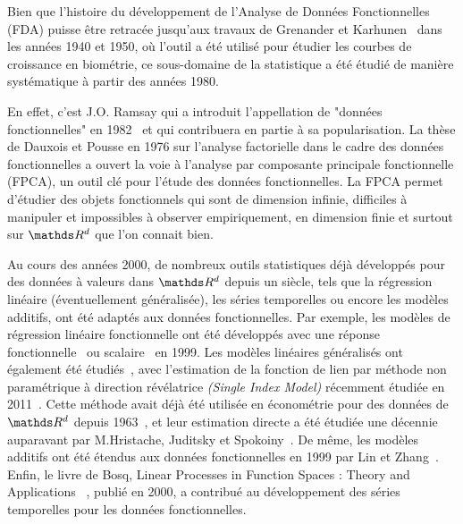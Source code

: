 

Bien que l'histoire du développement de l'Analyse de Données Fonctionnelles (FDA) puisse être retracée jusqu'aux travaux de Grenander et Karhunen~\cite{karhunen1946spektraltheorie} dans les années 1940 et 1950, où l'outil a été utilisé pour étudier les courbes de croissance en biométrie, ce sous-domaine de la statistique a été étudié de manière systématique à partir des années 1980.

\bigskip

En effet, c'est J.O. Ramsay qui a introduit l'appellation de "données fonctionnelles" en 1982~\cite{ramsay1982data} et qui contribuera en partie à sa popularisation. La thèse de Dauxois et Pousse en 1976 sur l'analyse factorielle dans le cadre des données fonctionnelles\cite{dauxois1976analyses} a ouvert la voie à l'analyse par composante principale fonctionnelle (FPCA), un outil clé pour l'étude des données fonctionnelles. La FPCA permet d'étudier des objets fonctionnels qui sont de dimension infinie, difficiles à manipuler et impossibles à observer empiriquement, en dimension finie et surtout sur $\R d$ que l'on connait bien.

\bigskip

Au cours des années 2000, de nombreux outils statistiques déjà développés pour des données à valeurs dans $\R d$ depuis un siècle, tels que la régression linéaire (éventuellement généralisée), les séries temporelles ou encore les modèles additifs, ont été adaptés aux données fonctionnelles.
Par exemple, les modèles de régression linéaire fonctionnelle ont été développés avec une réponse fonctionnelle~\cite{ramsay1991some} ou scalaire~\cite{cardot1999functional} en 1999.
Les modèles linéaires généralisés ont également été étudiés~\cite{james2002generalized,muller2005generalized}, avec l'estimation de la fonction de lien par méthode non paramétrique à direction révélatrice \emph{(Single Index Model)} récemment étudiée en 2011~\cite{chen2011single}.
Cette méthode avait déjà été utilisée en économétrie pour des données de $\R d$ depuis 1963~\cite{sharpe1963simplified}, et leur estimation directe a été étudiée une décennie auparavant par M.Hristache, Juditsky et Spokoiny~\cite{hristache2001direct}. De même, les modèles additifs ont été étendus aux données fonctionnelles en 1999 par Lin et Zhang~\cite{lin1999inference}.
Enfin, le livre de Bosq, \textcolor{flatuicolors_blue_devil}{Linear Processes in Function Spaces : Theory and Applications} ~\cite{bosq2000linear}, publié en 2000, a contribué au développement des séries temporelles pour les données fonctionnelles.

